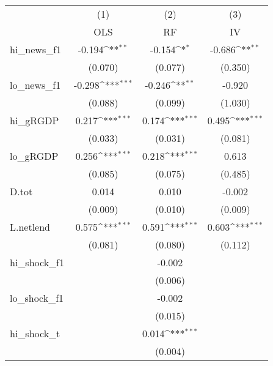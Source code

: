 {
\def\sym#1{\ifmmode^{#1}\else\(^{#1}\)\fi}
\begin{tabular}{l*{3}{c}}
\toprule
            &\multicolumn{1}{c}{(1)}&\multicolumn{1}{c}{(2)}&\multicolumn{1}{c}{(3)}\\
            &\multicolumn{1}{c}{OLS}&\multicolumn{1}{c}{RF}&\multicolumn{1}{c}{IV}\\
\midrule
hi\_news\_f1  &      -0.194\sym{**} &      -0.154\sym{*}  &      -0.686\sym{**} \\
            &     (0.070)         &     (0.077)         &     (0.350)         \\
\addlinespace
lo\_news\_f1  &      -0.298\sym{***}&      -0.246\sym{**} &      -0.920         \\
            &     (0.088)         &     (0.099)         &     (1.030)         \\
\addlinespace
hi\_gRGDP    &       0.217\sym{***}&       0.174\sym{***}&       0.495\sym{***}\\
            &     (0.033)         &     (0.031)         &     (0.081)         \\
\addlinespace
lo\_gRGDP    &       0.256\sym{***}&       0.218\sym{***}&       0.613         \\
            &     (0.085)         &     (0.075)         &     (0.485)         \\
\addlinespace
D.tot       &       0.014         &       0.010         &      -0.002         \\
            &     (0.009)         &     (0.010)         &     (0.009)         \\
\addlinespace
L.netlend   &       0.575\sym{***}&       0.591\sym{***}&       0.603\sym{***}\\
            &     (0.081)         &     (0.080)         &     (0.112)         \\
\addlinespace
hi\_shock\_f1 &                     &      -0.002         &                     \\
            &                     &     (0.006)         &                     \\
\addlinespace
lo\_shock\_f1 &                     &      -0.002         &                     \\
            &                     &     (0.015)         &                     \\
\addlinespace
hi\_shock\_t  &                     &       0.014\sym{***}&                     \\
            &                     &     (0.004)         &                     \\

\end{tabular}}

